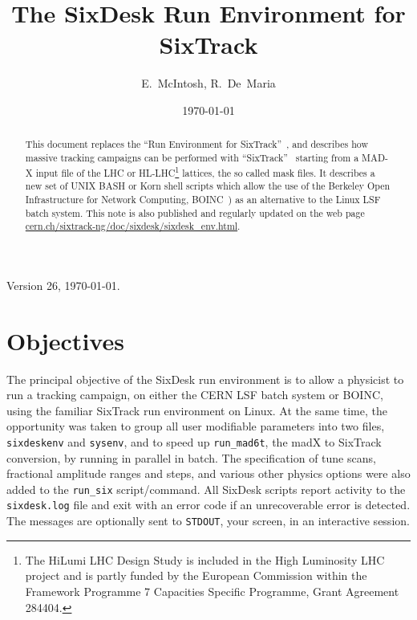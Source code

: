 \documentclass{cernatsnote}
\newcommand{\myhref}[2]{\href{#1}{\color{blue}#2}}
\begin{document}
\begin{titlepage}
\ifx \WEB \undefined
{}
\fi
\date{\today}
\title{The SixDesk Run Environment for SixTrack}
\author{E.~McIntosh, R.~De~Maria}
\ifx \WEB \undefined
{}
\fi

\maketitle

\ifx \WEB \undefined
 \begin{abstract}
 \fi
This document replaces the ``Run Environment for SixTrack''~\cite{Runsix}, and
describes how massive tracking campaigns can be performed with
``SixTrack''~\cite{SixTrack} starting from a MAD-X input file of the LHC
or HL-LHC\footnote{The HiLumi LHC Design Study is included in the High
  Luminosity LHC project and is partly funded by the European Commission
  within the Framework Programme 7 Capacities Specific Programme, Grant
Agreement 284404.} lattices, the so called mask files. It describes a new set
of UNIX BASH or Korn shell scripts which allow the use of the Berkeley Open
Infrastructure for Network Computing, BOINC~\cite{Boinc}) as an alternative to
the Linux LSF batch system. This note is also published and regularly updated
on the web page
\myhref{http://cern.ch/sixtrack-ng/doc/sixdesk/sixdesk_env.html}{cern.ch/sixtrack-ng/doc/sixdesk/sixdesk\_env.html}.
\ifx \WEB \undefined
\end{abstract}
\fi

\end{titlepage}
%
Version 26, \today.

\sloppy
\section{Objectives}
%
The principal objective of the SixDesk run environment is to allow a physicist
to run a tracking campaign, on either the CERN LSF batch system or BOINC, using
the familiar SixTrack run environment on Linux.  At the same time, the
opportunity was taken to group all user modifiable parameters into two files,
\texttt{sixdeskenv} and \texttt{sysenv}, and to speed up \texttt{run\_mad6t}, the madX
to SixTrack conversion, by running in parallel in batch.  The specification of
tune scans, fractional amplitude ranges and steps, and various other physics
options were also added to the \texttt{run\_six} script/command.  All SixDesk
scripts report activity to the \texttt{sixdesk.log} file and exit with an error
code if an unrecoverable error is detected.  The messages are optionally sent
to \texttt{STDOUT}, your screen, in an interactive session.
%
\end{document}
